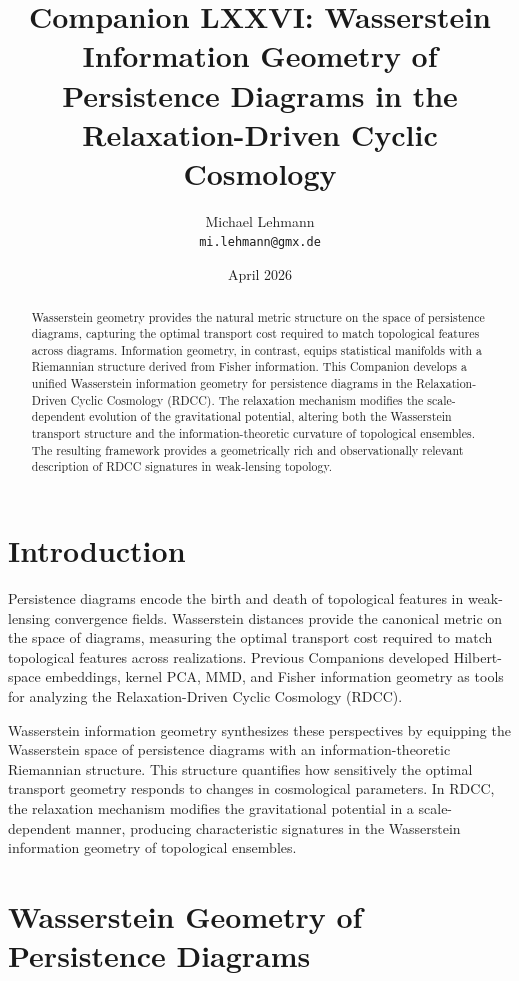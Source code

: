 \documentclass[11pt,a4paper]{article}
\title{\textbf{Companion LXXVI: Wasserstein Information Geometry of Persistence Diagrams in the Relaxation-Driven Cyclic Cosmology}}
\author{Michael Lehmann \\ \texttt{mi.lehmann@gmx.de}}
\date{April 2026}
\begin{document}
\maketitle

\begin{abstract}
Wasserstein geometry provides the natural metric structure on the space of 
persistence diagrams, capturing the optimal transport cost required to match 
topological features across diagrams. Information geometry, in contrast, equips 
statistical manifolds with a Riemannian structure derived from Fisher information. 
This Companion develops a unified Wasserstein information geometry for persistence 
diagrams in the Relaxation-Driven Cyclic Cosmology (RDCC). The relaxation 
mechanism modifies the scale-dependent evolution of the gravitational potential, 
altering both the Wasserstein transport structure and the information-theoretic 
curvature of topological ensembles. The resulting framework provides a 
geometrically rich and observationally relevant description of RDCC signatures in 
weak-lensing topology.
\end{abstract}
\section{Introduction}

Persistence diagrams encode the birth and death of topological features in weak-
lensing convergence fields. Wasserstein distances provide the canonical metric on 
the space of diagrams, measuring the optimal transport cost required to match 
topological features across realizations. Previous Companions developed Hilbert-
space embeddings, kernel PCA, MMD, and Fisher information geometry as tools for 
analyzing the Relaxation-Driven Cyclic Cosmology (RDCC).

Wasserstein information geometry synthesizes these perspectives by equipping the 
Wasserstein space of persistence diagrams with an information-theoretic Riemannian 
structure. This structure quantifies how sensitively the optimal transport 
geometry responds to changes in cosmological parameters. In RDCC, the relaxation 
mechanism modifies the gravitational potential in a scale-dependent manner, 
producing characteristic signatures in the Wasserstein information geometry of 
topological ensembles.
\section{Wasserstein Geometry of Persistence Diagrams}
\end{document}
